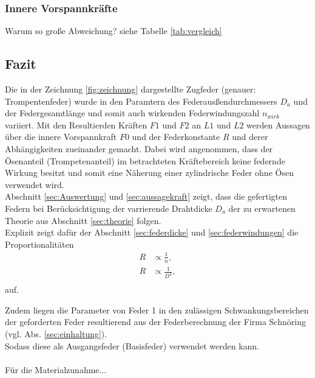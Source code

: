 \subsubsection{Innere Vorspannkräfte}
Warum so große Abweichung? siehe Tabelle \ref{tab:vergleich}

\subsection{Fazit}
Die in der Zeichnung \ref{fig:zeichnung} dargestellte Zugfeder (genauer: Trompentenfeder)
wurde in den Paramtern des Federausßendurchmessers $D_a$ und der Federgesamtlänge und somit auch
wirkenden Federwindungszahl $n_{wirk}$ variiert. Mit den Resultierden Kräften $F1$ und $F2$ an
$L1$ und $L2$ werden Aussagen über die innere Vorspannkraft $F0$ und der Federkonstante $R$ und derer
Abhängigkeiten zueinander gemacht. Dabei wird angenommen, dass der Ösenanteil (Trompetenanteil) 
im betrachteten Kräftebereich keine federnde Wirkung besitzt und somit eine Näherung einer
zylindrische Feder ohne Ösen verwendet wird.\\

Abschnitt \ref{sec:Auswertung} und \ref{sec:aussagekraft} zeigt, dass die gefertigten Federn 
bei Berücksichtigung der varrierende Drahtdicke $D_a$ der zu erwartenen 
Theorie aus Abschnitt \ref{sec:theorie} folgen.\\

Explizit zeigt dafür der Abschnitt \ref{sec:federdicke} und \ref{sec:federwindungen} die Proportionalitäten 
\begin{align*}
    R &\propto \frac{1}{n},\\
    R &\propto \frac{1}{D^3},\\
\end{align*}
auf.


Zudem liegen die Parameter von Feder 1 in den zulässigen Schwankungsbereichen 
der geforderten Feder resultierend aus der Federberechnung der Firma Schnöring (vgl. Abs. \ref{sec:einhaltung}).\\ 
Sodass diese als Ausgangsfeder (Basisfeder) verwendet werden kann.\\\\

Für die Materialzunahme...









